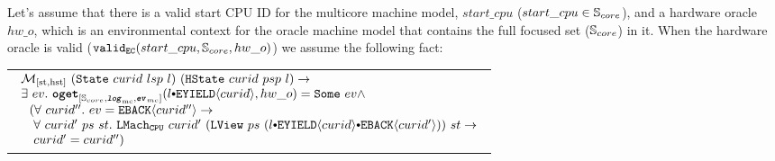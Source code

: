 \begin{hypothesis}
\label{hypo:chapter:conlink:mc-hw-refines-oracle-hypo}
Let's assume that there is a valid start CPU ID for the multicore machine model, 
$start\_cpu$ ($start\_cpu \in {\mathbb{S}_{core}}$), and a hardware oracle $hw\_o$,  
which is an environmental context for the oracle machine model that contains the full focused set (${\mathbb{S}_{core}}$) in it.
When the hardware oracle is valid ($ {{\mathrm{\texttt{valid}}}_{{\mathrm{\texttt{EC}}}}}({start\_cpu}, {{\mathbb{S}_{core}}}, {hw\_o})$) we assume the following fact:
\begin{center}
\begin{tabular}{P{0.95\textwidth}}
$
\begin{array}{l}
\matchstatehstate{(\mcstate{curid}{lsp}{l})}{(\hstate{curid}{psp}{l})} \rightarrow \\
\exists\ ev .\ \oget{\coreset}{\mclog}{\mcevent}{\listconsoppo{\yieldev{curid}}{l}}{hw\_o}{ev} \wedge \\
\ \ (\forall \ curid'' . \ ev = \yieldbackev{curid''} \rightarrow\\
 \ \ \  \forall \ curid' \ ps \ st .\  \hardwarelocalstep{curid'}{(\localview{ps}{(\listconsoppo{\yieldbackev{curid'}}{\listconsoppo{\yieldev{curid}}{l}})})}{st} \rightarrow \\
 \ \  \ curid' = curid'') \\
\end{array}
$
\end{tabular}
\end{center}
\end{hypothesis}



